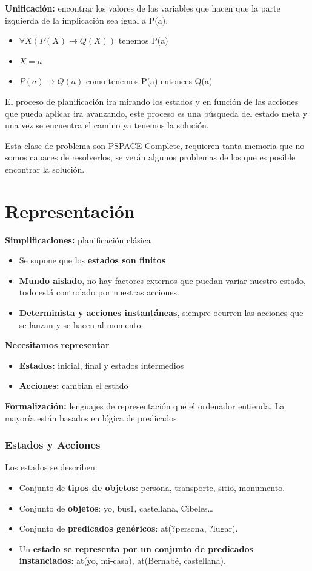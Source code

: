 \documentclass[12pt, twoside, openright]{report} %
\begin{document}
\textbf{Unificación:} encontrar los valores de las variables que hacen que la parte izquierda de la implicación sea igual a P(a).
\begin{itemize}
	\item $\forall X (P(X) \rightarrow Q(X))$ tenemos P(a)
	\item $X=a$
	\item $P(a) \rightarrow Q(a)$ como tenemos P(a) entonces Q(a)
\end{itemize}

El proceso de planificación ira mirando los estados y en función de las acciones que pueda aplicar ira avanzando, este proceso es una búsqueda del estado meta y una vez se encuentra el camino ya tenemos la solución.

Esta clase de problema son PSPACE-Complete, requieren tanta memoria que no somos capaces de resolverlos, se verán algunos problemas de los que es posible encontrar la solución.

\section{Representación}
\textbf{Simplificaciones:} planificación clásica
\begin{itemize}
	\item Se supone que los \textbf{estados son finitos}
	\item \textbf{Mundo aislado}, no hay factores externos que puedan variar nuestro estado, todo está controlado por nuestras acciones.
	\item \textbf{Determinista y acciones instantáneas}, siempre ocurren las acciones que se lanzan y se hacen al momento.
\end{itemize}

\textbf{Necesitamos representar}
\begin{itemize}
	\item \textbf{Estados:} inicial, final y estados intermedios
	\item \textbf{Acciones:} cambian el estado
\end{itemize}

\textbf{Formalización:} lenguajes de representación que el ordenador entienda. La mayoría están basados en lógica de predicados

\subsubsection{Estados y Acciones}
Los estados se describen:
\begin{itemize}
	\item Conjunto de \textbf{tipos de objetos}: persona, transporte, sitio, monumento.
	\item Conjunto de \textbf{objetos}: yo, bus1, castellana, Cibeles…
	\item Conjunto de \textbf{predicados genéricos}: at(?persona, ?lugar).
	\item Un \textbf{estado se representa por un conjunto de predicados instanciados}: at(yo, mi-casa), at(Bernabé, castellana).
\end{itemize}
\end{document}
